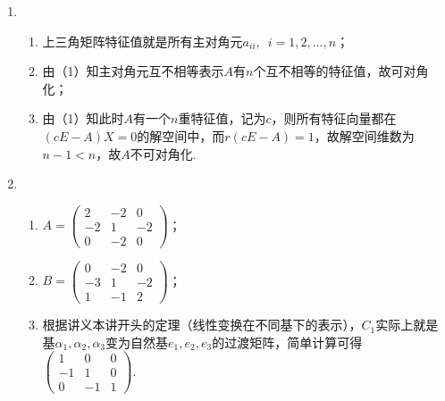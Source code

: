 \begin{enumerate}
    \item \begin{enumerate}
              \item 上三角矩阵特征值就是所有主对角元$a_{ii},\enspace i=1,2,\ldots,n$；

              \item 由（1）知主对角元互不相等表示$A$有$n$个互不相等的特征值，故可对角化；

              \item 由（1）知此时$A$有一个$n$重特征值，记为$c$，则所有特征向量都在$(cE-A)X=0$的解空间中，而$r(cE-A)=1$，故解空间维数为$n-1<n$，故$A$不可对角化.
          \end{enumerate}

    \item \begin{enumerate}
              \item $A=\begin{pmatrix}
                            2 & -2 & 0 \\ -2 & 1 & -2 \\ 0 & -2 & 0
                        \end{pmatrix}$；

              \item $B=\begin{pmatrix}
                            0 & -2 & 0 \\ -3 & 1 & -2 \\ 1 & -1 & 2
                        \end{pmatrix}$；

              \item 根据讲义本讲开头的定理（线性变换在不同基下的表示），$C_1$实际上就是基$\alpha_1,\alpha_2,\alpha_3$变为自然基$e_1,e_2,e_3$的过渡矩阵，简单计算可得$\begin{pmatrix}
                            1 & 0 & 0 \\ -1 & 1 & 0 \\ 0 & -1 & 1
                        \end{pmatrix}$.
          \end{enumerate}


\end{enumerate}
